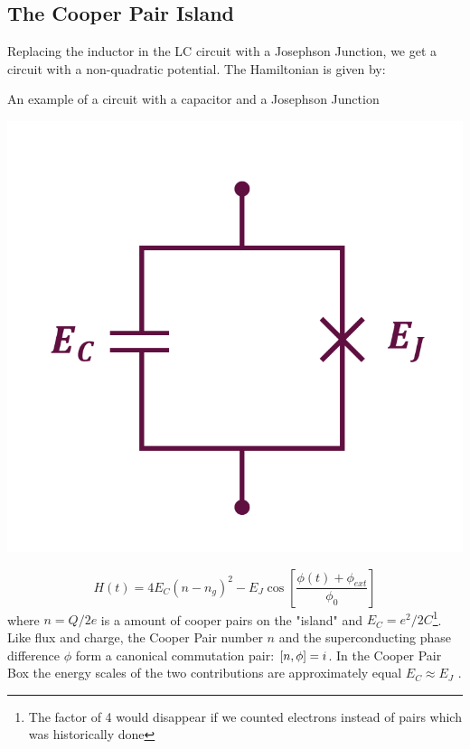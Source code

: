 \subsection{The Cooper Pair Island}
Replacing the inductor in the LC circuit with a Josephson Junction, we get a circuit with a non-quadratic potential. The Hamiltonian is given by:
\begin{marginfigure}
    \caption{An example of a circuit with a capacitor and a Josephson Junction}
    \includegraphics[width = \textwidth]{tex/fig_for_text/CooperPairIsland.png}
    \label{fig:cooper_pair_island}
\end{marginfigure}

\begin{equation}
    H(t) =  4 E_C (n - n_g)^2 -  E_J \cos \left[ \frac{\phi(t) + \phi_{ext}}{\phi_0} \right]
\end{equation}
where $n = Q/2e$ is a amount of cooper pairs on the "island" and $E_C = e^2/2C$\footnote{The factor of 4 would disappear if we counted electrons instead of pairs which was historically done}. Like flux and charge, the Cooper Pair number $n$ and the superconducting phase difference $\phi$ form a canonical commutation pair: $\comm{n}{\phi} = i$. In the Cooper Pair Box the energy scales of the two contributions are approximately equal $E_C \approx E_J$ \cite{blais_circuit_2021}. 


